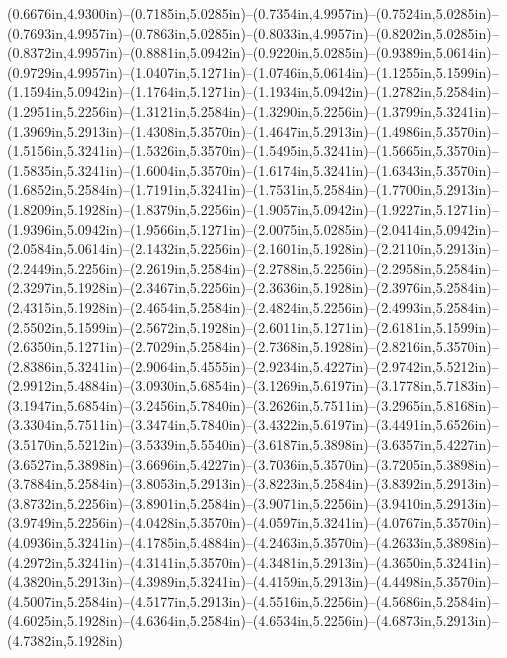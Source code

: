 (0.6676in,4.9300in)--(0.7185in,5.0285in)--(0.7354in,4.9957in)--(0.7524in,5.0285in)--(0.7693in,4.9957in)--(0.7863in,5.0285in)--(0.8033in,4.9957in)--(0.8202in,5.0285in)--(0.8372in,4.9957in)--(0.8881in,5.0942in)--(0.9220in,5.0285in)--(0.9389in,5.0614in)--(0.9729in,4.9957in)--(1.0407in,5.1271in)--(1.0746in,5.0614in)--(1.1255in,5.1599in)--(1.1594in,5.0942in)--(1.1764in,5.1271in)--(1.1934in,5.0942in)--(1.2782in,5.2584in)--(1.2951in,5.2256in)--(1.3121in,5.2584in)--(1.3290in,5.2256in)--(1.3799in,5.3241in)--(1.3969in,5.2913in)--(1.4308in,5.3570in)--(1.4647in,5.2913in)--(1.4986in,5.3570in)--(1.5156in,5.3241in)--(1.5326in,5.3570in)--(1.5495in,5.3241in)--(1.5665in,5.3570in)--(1.5835in,5.3241in)--(1.6004in,5.3570in)--(1.6174in,5.3241in)--(1.6343in,5.3570in)--(1.6852in,5.2584in)--(1.7191in,5.3241in)--(1.7531in,5.2584in)--(1.7700in,5.2913in)--(1.8209in,5.1928in)--(1.8379in,5.2256in)--(1.9057in,5.0942in)--(1.9227in,5.1271in)--(1.9396in,5.0942in)--(1.9566in,5.1271in)--(2.0075in,5.0285in)--(2.0414in,5.0942in)--(2.0584in,5.0614in)--(2.1432in,5.2256in)--(2.1601in,5.1928in)--(2.2110in,5.2913in)--(2.2449in,5.2256in)--(2.2619in,5.2584in)--(2.2788in,5.2256in)--(2.2958in,5.2584in)--(2.3297in,5.1928in)--(2.3467in,5.2256in)--(2.3636in,5.1928in)--(2.3976in,5.2584in)--(2.4315in,5.1928in)--(2.4654in,5.2584in)--(2.4824in,5.2256in)--(2.4993in,5.2584in)--(2.5502in,5.1599in)--(2.5672in,5.1928in)--(2.6011in,5.1271in)--(2.6181in,5.1599in)--(2.6350in,5.1271in)--(2.7029in,5.2584in)--(2.7368in,5.1928in)--(2.8216in,5.3570in)--(2.8386in,5.3241in)--(2.9064in,5.4555in)--(2.9234in,5.4227in)--(2.9742in,5.5212in)--(2.9912in,5.4884in)--(3.0930in,5.6854in)--(3.1269in,5.6197in)--(3.1778in,5.7183in)--(3.1947in,5.6854in)--(3.2456in,5.7840in)--(3.2626in,5.7511in)--(3.2965in,5.8168in)--(3.3304in,5.7511in)--(3.3474in,5.7840in)--(3.4322in,5.6197in)--(3.4491in,5.6526in)--(3.5170in,5.5212in)--(3.5339in,5.5540in)--(3.6187in,5.3898in)--(3.6357in,5.4227in)--(3.6527in,5.3898in)--(3.6696in,5.4227in)--(3.7036in,5.3570in)--(3.7205in,5.3898in)--(3.7884in,5.2584in)--(3.8053in,5.2913in)--(3.8223in,5.2584in)--(3.8392in,5.2913in)--(3.8732in,5.2256in)--(3.8901in,5.2584in)--(3.9071in,5.2256in)--(3.9410in,5.2913in)--(3.9749in,5.2256in)--(4.0428in,5.3570in)--(4.0597in,5.3241in)--(4.0767in,5.3570in)--(4.0936in,5.3241in)--(4.1785in,5.4884in)--(4.2463in,5.3570in)--(4.2633in,5.3898in)--(4.2972in,5.3241in)--(4.3141in,5.3570in)--(4.3481in,5.2913in)--(4.3650in,5.3241in)--(4.3820in,5.2913in)--(4.3989in,5.3241in)--(4.4159in,5.2913in)--(4.4498in,5.3570in)--(4.5007in,5.2584in)--(4.5177in,5.2913in)--(4.5516in,5.2256in)--(4.5686in,5.2584in)--(4.6025in,5.1928in)--(4.6364in,5.2584in)--(4.6534in,5.2256in)--(4.6873in,5.2913in)--(4.7382in,5.1928in)
